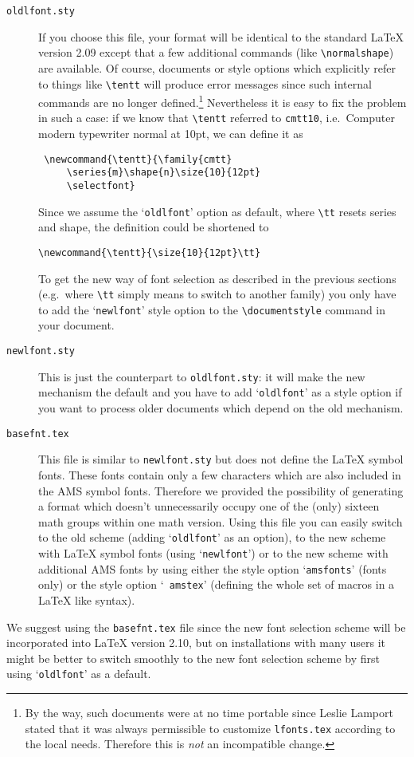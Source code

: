 \begin{description}
 \item[{\tt oldlfont.sty}]
    If you choose this file, your format will be identical to the
     standard \LaTeX{} version 2.09 except that a few additional
     commands (like \verb+\normalshape+) are available.  Of course,
     documents or style options which explicitly refer to things like
     \verb+\tentt+ will produce error messages since such internal
     commands are no longer defined.\footnote{By the way, such
     documents were at no time portable since Leslie Lamport stated
     that it was always permissible to customize {\tt lfonts.tex}
     according to the local needs. Therefore this is {\em not\/} an
     incompatible change.} Nevertheless it is easy to fix the
     problem in such a case: if we know that \verb+\tentt+ referred to
     {\tt cmtt10}, i.e.\ Computer modern typewriter normal at 10pt,
     we can define it as
    \begin{verbatim}
 \newcommand{\tentt}{\family{cmtt}
     \series{m}\shape{n}\size{10}{12pt}
     \selectfont}
\end{verbatim}
    Since we assume the `{\tt oldlfont}' option as default, where
     \verb+\tt+ resets series and shape, the definition could be
     shortened to
    \begin{verbatim}
\newcommand{\tentt}{\size{10}{12pt}\tt}
\end{verbatim}
    To get the new way of font selection as described in the previous
     sections (e.g.\ where \verb+\tt+ simply means to switch to another
     family) you only have to add the `{\tt newlfont}' style option to
     the \verb+\documentstyle+ command in your document.
 
  \item[\tt newlfont.sty]
    This is just the counterpart to {\tt oldlfont.sty}: it will make
     the new mechanism the default and you have to add `{\tt oldlfont}'
     as a style option if you want to process older documents which
     depend on the old mechanism.
 
  \item[\tt basefnt.tex]
    This file is similar to {\tt newlfont.sty} but does not define the
     \LaTeX{} symbol fonts. These fonts contain only a few characters
     which are also included in the AMS symbol fonts.  Therefore we
     provided the possibility of generating a format which doesn't
     unnecessarily occupy one of the (only) sixteen math groups within
     one math version. Using this file you can easily switch to the
     old scheme (adding `{\tt oldlfont}' as an option), to the new
     scheme with \LaTeX{} symbol fonts (using `{\tt newlfont}') or to
     the new scheme with additional AMS fonts by using either the
     style option `{\tt amsfonts}' (fonts only) or the style option `{\tt
     amstex}' (defining the whole set of \AmSTeX{} macros in a \LaTeX{}
     like syntax).
 \end{description}
We suggest using the {\tt basefnt.tex} file since the new font
 selection scheme will be incorporated into \LaTeX{} version 2.10, but
 on installations with many users it might be better to switch
 smoothly to the new font
 selection scheme by first using `{\tt oldlfont}' as a default.
 
